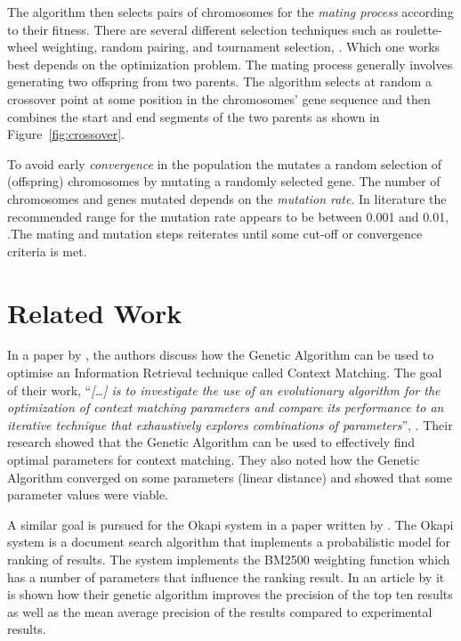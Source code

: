 The algorithm then selects pairs of chromosomes for the \textit{mating process} according to their fitness. There are several different selection techniques such as roulette-wheel weighting, random pairing, and tournament selection, \parencite{Haupt2004a}. Which one works best depends on the optimization problem. The mating process generally involves generating two offspring from two parents. The algorithm selects at random a crossover point at some position in the chromosomes' gene sequence and then combines the start and end segments of the two parents as shown in Figure~\ref{fig:crossover}.

To avoid early \textit{convergence} in the population the \GA mutates a random selection of (offspring) chromosomes by mutating a randomly selected gene. The number of chromosomes and genes mutated depends on the \textit{mutation rate}. In literature the recommended range for the mutation rate appears to be between 0.001 and 0.01, \parencite{Goldberg1989,Negnevitsky2002}.The mating and mutation steps reiterates until some cut-off or convergence criteria is met.

\section{Related Work}
\label{RelatedWork}
In  a paper by \citeauthor{Zakos2005}, the authors discuss how the Genetic Algorithm can be used to optimise an Information Retrieval technique called Context Matching. The goal of their work, ``\textit{[\dots] is to investigate the use of an evolutionary algorithm for the optimization of context matching parameters and compare its performance to an iterative technique that exhaustively explores combinations of parameters}'', \parencite[][582]{Zakos2005}. Their research showed that the Genetic Algorithm can be used to effectively find optimal parameters for context matching. They also noted how the Genetic Algorithm converged on some parameters (linear distance) and showed that some parameter values were viable.

A similar goal is pursued for the Okapi system in a paper written by \cite{Chuan2003}. The Okapi system is a document search algorithm that implements a probabilistic model for ranking of results. The system implements the BM2500 weighting function which has a number of parameters that influence the ranking result. In an article by \cite{Chuan2003} it is shown how their genetic algorithm improves the precision of the top ten results as well as the mean average precision of the results compared to experimental results.

